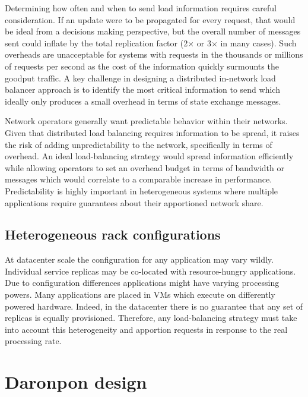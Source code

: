 Determining how often and when to send load information requires
careful consideration. If an update were to be propagated for every
request, that would be ideal from a decisions making perspective, but
the overall number of messages sent could inflate by the total
replication factor (2$\times$ or 3$\times$ in many cases).  Such
overheads are unacceptable for systems with requests in the thousands
or millions of requests per second as the cost of the information
quickly surmounts the goodput traffic. A key challenge in designing a
distributed in-network load balancer approach is to identify the most
critical information to send which ideally only produces a small
overhead in terms of state exchange messages.


Network operators generally want predictable behavior within their networks.
Given that distributed load balancing requires information to be spread, it
raises the risk of adding unpredictability to the network, specifically in
terms of overhead. An ideal load-balancing strategy would spread information
efficiently while allowing operators to set an overhead budget in terms of
bandwidth or messages which would correlate to a comparable increase in
performance. Predictability is highly important in heterogeneous systems where
multiple applications require guarantees about their apportioned network share.

\subsection{Heterogeneous rack configurations}

At datacenter scale the configuration for any application may vary wildly.
Individual service replicas may be co-located with resource-hungry applications.
Due to configuration differences applications might have varying processing
powers. Many applications are placed in VMs which execute on differently
powered hardware. Indeed, in the datacenter there is no guarantee that any set
of replicas is equally provisioned. Therefore, any load-balancing strategy must
take into account this heterogeneity and apportion requests in response to the
real processing rate.

\section{Daronpon design}
\label{darapon:sec:design}

